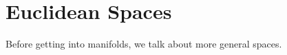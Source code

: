\begingroup
    \ifcsname\PATH\endcsname
        \newcommand{\PATH}{books/Geometry/Manifolds}
        \newcommand{\OLDPATH}{\PATH}
    \else
        \newcommand{\OLDPATH}{\PATH}
        \renewcommand{\PATH}{books/Geometry/Manifolds}
    \fi
    \chapter{Euclidean Spaces}
        \label{chapt:Euclidean_Spaces}%
        Before getting into manifolds, we talk about more general spaces.
        
    \renewcommand{\PATH}{\OLDPATH}
\endgroup